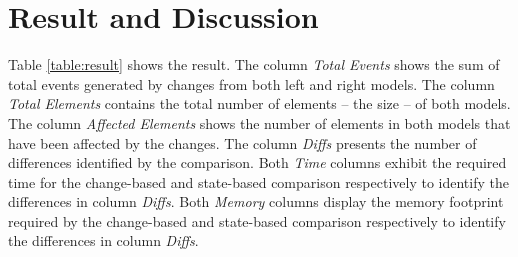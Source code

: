 \documentclass{llncs}
\begin{document}
\section{Result and Discussion}
\label{sec:discussion}

Table \ref{table:result} shows the result. The column \textit{Total Events} shows the sum of total events generated by changes from both left and right models. The column \textit{Total Elements} contains the total number of elements -- the size -- of both models. The column \textit{Affected Elements} shows the number of elements in both models that have been affected by the changes. The column \textit{Diffs} presents the number of differences identified by the comparison. Both \textit{Time} columns exhibit the required time for the change-based and state-based comparison respectively to identify the differences in column \textit{Diffs}. Both \textit{Memory} columns display the memory footprint required by the change-based and state-based comparison respectively to identify the differences in column \textit{Diffs}. 
\end{document}
